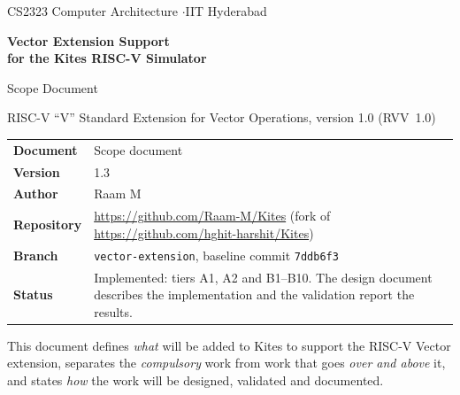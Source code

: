 \documentclass[11pt]{article}
\begin{document}
\begin{titlepage}
\thispagestyle{empty}
\vspace*{1.2cm}
{\sffamily\small\color{kgrey} CS2323 Computer Architecture \quad$\cdot$\quad IIT Hyderabad}\par
\vspace{0.6cm}
{\sffamily\bfseries\fontsize{26}{31}\selectfont\color{kblue} Vector Extension Support\\[2pt] for the Kites RISC-V Simulator\par}
\vspace{0.5cm}
{\sffamily\Large\color{kteal} Scope Document\par}
\vspace{0.2cm}
{\large RISC-V ``V'' Standard Extension for Vector Operations, version 1.0 (RVV~1.0)\par}
\vspace{1.4cm}

\begin{tabularx}{\textwidth}{@{}L{3.6cm}Y@{}}
\toprule
\textsf{\textbf{Document}}   & Scope document \\
\textsf{\textbf{Version}}    & 1.3 \\
\textsf{\textbf{Author}}     & Raam M \\
\textsf{\textbf{Repository}} & \url{https://github.com/Raam-M/Kites} (fork of \url{https://github.com/hghit-harshit/Kites}) \\
\textsf{\textbf{Branch}}     & \texttt{vector-extension}, baseline commit \texttt{7ddb6f3} \\
\textsf{\textbf{Status}}     & Implemented: tiers A1, A2 and B1--B10. The design document describes the implementation and the validation report the results. \\
\bottomrule
\end{tabularx}

\vspace{1.0cm}
\begin{keybox}[title=Purpose of this document]
This document defines \emph{what} will be added to Kites to support the RISC-V Vector extension,
separates the \emph{compulsory} work from work that goes \emph{over and above} it, and states
\emph{how} the work will be designed, validated and documented.
\end{keybox}


\end{titlepage}
\end{document}
